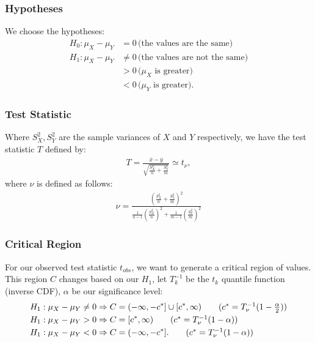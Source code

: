 \documentclass[a4paper, 12pt, twoside]{article}
\begin{document}
\subsubsection{Hypotheses}

We choose the hypotheses:
\begin{align*}
    H_0 : \mu_X - \mu_Y & = 0 \, \text{(the values are the same)}        \\
    H_1 : \mu_X - \mu_Y & \neq 0 \, \text{(the values are not the same)} \\
                        & > 0 \, \text{($\mu_X$ is greater)}             \\
                        & < 0 \, \text{($\mu_Y$ is greater)}.
\end{align*}

\subsubsection{Test Statistic}

Where $S_X^2, S_Y^2$ are the sample variances of $X$ and $Y$
respectively, we have the test statistic $T$ defined by:
\begin{align*}
    T = \frac{\overline{x} - \overline{y}}
    {\sqrt{\frac{S_X^2}{n} + \frac{S_Y^2}{m}}} \simeq t_\nu,
\end{align*}
where $\nu$ is defined as follows:
\begin{align*}
    \nu = \frac{(\frac{S_X^2}{n} + \frac{S_Y^2}{m})^2}
    {\frac{1}{n - 1}(\frac{S_X^2}{n})^2
        + \frac{1}{m - 1}(\frac{S_Y^2}{m})^2}
\end{align*}

\subsubsection{Critical Region}

For our observed test statistic $t_{obs}$, we want to generate a
critical region of values. This region $C$ changes based on our
$H_1$, let $T_k^{-1}$ be the $t_k$ quantile function (inverse CDF),
$\alpha$ be our significance level:
\begin{align*}
    H_1 : \mu_X - \mu_Y \neq 0 & \Rightarrow
    C = (-\infty, -c^*] \cup [c^*, \infty)
    \tag{$ c^* = T^{-1}_{\nu}(1 - \frac{\alpha}{2}) $}            \\
    H_1 : \mu_X - \mu_Y > 0    & \Rightarrow
    C = [c^*, \infty) \tag{$ c^* = T^{-1}_{\nu}(1 - \alpha) $}    \\
    H_1 : \mu_X - \mu_Y < 0    & \Rightarrow C = (-\infty, -c^*].
    \tag{$ c^* = T^{-1}_{\nu}(1 - \alpha) $}
\end{align*}
\end{document}
